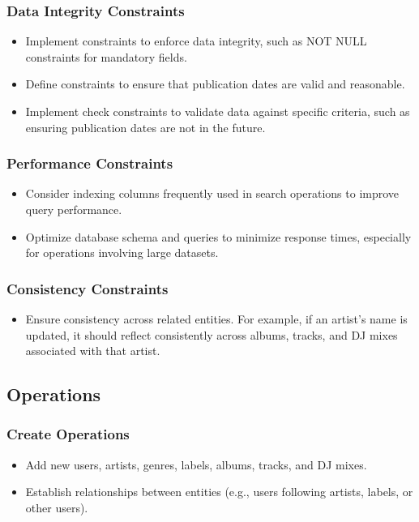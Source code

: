 \documentclass{article}
\begin{document}
\subsubsection{Data Integrity Constraints}
\begin{itemize}
    \item Implement constraints to enforce data integrity, such as NOT NULL constraints for mandatory fields.
    \item Define constraints to ensure that publication dates are valid and reasonable.
    \item Implement check constraints to validate data against specific criteria, such as ensuring publication dates are not in the future.
\end{itemize}

\subsubsection{Performance Constraints}
\begin{itemize}
    \item Consider indexing columns frequently used in search operations to improve query performance.
    \item Optimize database schema and queries to minimize response times, especially for operations involving large datasets.
\end{itemize}

\subsubsection{Consistency Constraints}
\begin{itemize}
    \item Ensure consistency across related entities. For example, if an artist's name is updated, it should reflect consistently across albums, tracks, and DJ mixes associated with that artist.
\end{itemize}

\subsection{Operations}

\subsubsection{Create Operations}
\begin{itemize}
    \item Add new users, artists, genres, labels, albums, tracks, and DJ mixes.
    \item Establish relationships between entities (e.g., users following artists, labels, or other users).
\end{itemize}
\end{document}
